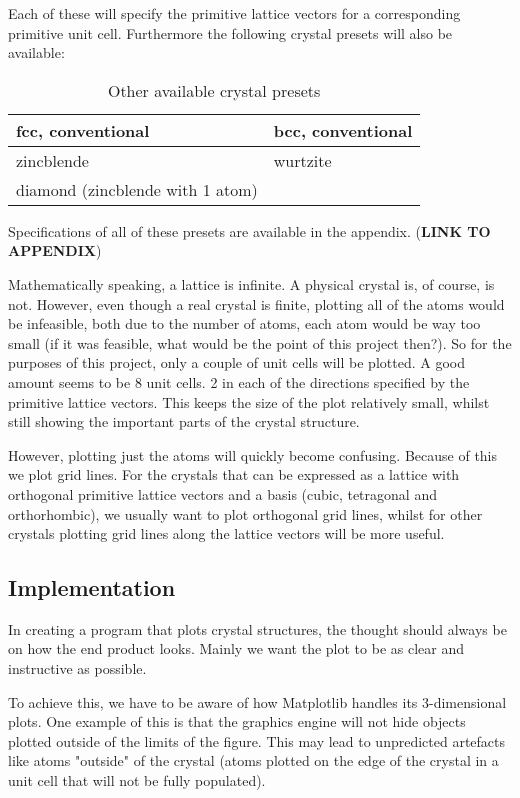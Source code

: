 \documentclass[main.tex]{subfiles}
\begin{document}
	Each of these will specify the primitive lattice vectors for a corresponding primitive unit cell. Furthermore the following crystal presets will also be available:
	\begin{table}
		\centering
		\begin{tabular}{|l|l|}
			\hline
			fcc, conventional & bcc, conventional \\
			\hline
			zincblende & wurtzite \\
			\hline
			diamond (zincblende with 1 atom) & \\
			\hline
		\end{tabular}
		\caption{Other available crystal presets}
		\label{tab:presets}
	\end{table}
	Specifications of all of these presets are available in the appendix. (\textbf{LINK TO APPENDIX})
	
	Mathematically speaking, a lattice is infinite. A physical crystal is, of course, is not. However, even though a real crystal is finite, plotting all of the atoms would be infeasible, both due to the number of atoms, each atom would be way too small (if it was feasible, what would be the point of this project then?). So for the purposes of this project, only a couple of unit cells will be plotted. A good amount seems to be 8 unit cells. 2 in each of the directions specified by the primitive lattice vectors. This keeps the size of the plot relatively small, whilst still showing the important parts of the crystal structure.
	
	However, plotting just the atoms will quickly become confusing. Because of this we plot grid lines. For the crystals that can be expressed as a lattice with orthogonal primitive lattice vectors and a basis (cubic, tetragonal and orthorhombic), we usually want to plot orthogonal grid lines, whilst for other crystals plotting grid lines along the lattice vectors will be more useful.
	
	
	\subsection{Implementation}
	In creating a program that plots crystal structures, the thought should always be on how the end product looks. Mainly we want the plot to be as clear and instructive as possible.
	
	To achieve this, we have to be aware of how Matplotlib handles its 3-dimensional plots. One example of this is that the graphics engine will not hide objects plotted outside of the limits of the figure. This may lead to unpredicted artefacts like atoms "outside" of the crystal (atoms plotted on the edge of the crystal in a unit cell that will not be fully populated).
	
\end{document}
